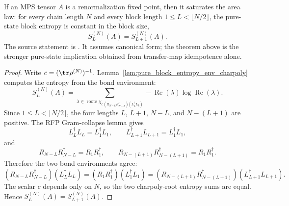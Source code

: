 \begin{theorem}
    \label{thm:rfp-saturates-area-law}
    \leanok
    If an MPS tensor $A$ is a renormalization fixed point, then it saturates the
    area law: for every chain length $N$ and every block length
    $1\le L<\lfloor N/2\rfloor$, the pure-state block entropy is constant in the
    block size,
    \[
        S_L^{(N)}(A) = S_{L+1}^{(N)}(A).
    \]
    The source statement is
    \cite[Proposition~ZCLandSALpure, lines~606--608]{Cirac2016MPDO_arXiv}.
    It assumes canonical form; the theorem above is the stronger pure-state
    implication obtained from transfer-map idempotence alone.
\end{theorem}
\begin{proof}\leanok
    Write $c=(\tr\rho^{(N)})^{-1}$. Lemma~\ref{lem:pure_block_entropy_env_charpoly}
    computes the entropy from the bond environment:
    \[
        S_L^{(N)}(A)
        =
        \sum_{\lambda\in
            \operatorname{roots}\chi_{c\,(R_{N-L}R_{N-L}^\dagger)
                (L_L^\dagger L_L)}}
            -\operatorname{Re}(\lambda)\log\operatorname{Re}(\lambda).
    \]
    Since $1\le L<\lfloor N/2\rfloor$, the four lengths
    $L$, $L+1$, $N-L$, and $N-(L+1)$ are positive. The RFP Gram-collapse lemma
    gives
    \[
        L_L^\dagger L_L=L_1^\dagger L_1,\qquad
        L_{L+1}^\dagger L_{L+1}=L_1^\dagger L_1,
    \]
    and
    \[
        R_{N-L}R_{N-L}^\dagger=R_1R_1^\dagger,\qquad
        R_{N-(L+1)}R_{N-(L+1)}^\dagger=R_1R_1^\dagger .
    \]
    Therefore the two bond environments agree:
    \[
        (R_{N-L}R_{N-L}^\dagger)(L_L^\dagger L_L)
        =
        (R_1R_1^\dagger)(L_1^\dagger L_1)
        =
        (R_{N-(L+1)}R_{N-(L+1)}^\dagger)
            (L_{L+1}^\dagger L_{L+1}).
    \]
    The scalar $c$ depends only on $N$, so the two charpoly-root entropy sums
    are equal. Hence $S_L^{(N)}(A)=S_{L+1}^{(N)}(A)$.
\end{proof}

